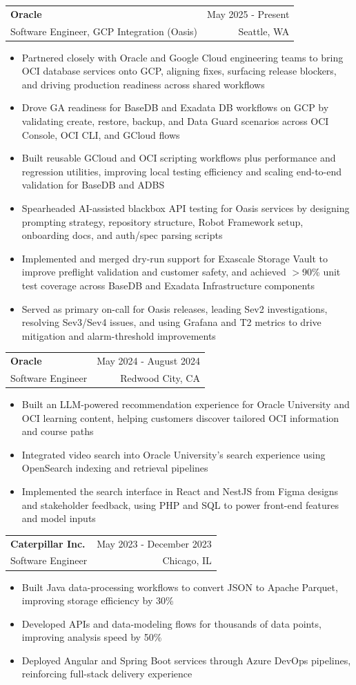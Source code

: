 \documentclass[letterpaper,11pt]{article}
\makeatletter
\newcommand{\resumeItem}[1]{
  \item\small{
    {#1 \vspace{-2pt}}
  }
}
\newcommand{\resumeSubheading}[4]{
  \vspace{-2pt}\item
    \begin{tabular*}{0.97\textwidth}[t]{l@{\extracolsep{\fill}}r}
      \textbf{#1} & #2 \\
      {\small#3} & {\small #4} \\
    \end{tabular*}\vspace{-7pt}
}
\newcommand{\resumeItemListStart}{\begin{itemize}[itemsep=1pt, parsep=0pt, topsep=2pt]}
\newcommand{\resumeItemListEnd}{\end{itemize}\vspace{-5pt}}
\makeatother
\begin{document}
    \resumeSubheading
  {Oracle}{May 2025 - Present}
  {Software Engineer, GCP Integration (Oasis)}{Seattle, WA}
  \resumeItemListStart
    \resumeItem{Partnered closely with Oracle and Google Cloud engineering teams to bring OCI database services onto GCP, aligning fixes, surfacing release blockers, and driving production readiness across shared workflows}
    \resumeItem{Drove GA readiness for BaseDB and Exadata DB workflows on GCP by validating create, restore, backup, and Data Guard scenarios across OCI Console, OCI CLI, and GCloud flows}
    \resumeItem{Built reusable GCloud and OCI scripting workflows plus performance and regression utilities, improving local testing efficiency and scaling end-to-end validation for BaseDB and ADBS}
    \resumeItem{Spearheaded AI-assisted blackbox API testing for Oasis services by designing prompting strategy, repository structure, Robot Framework setup, onboarding docs, and auth/spec parsing scripts}
    \resumeItem{Implemented and merged dry-run support for Exascale Storage Vault to improve preflight validation and customer safety, and achieved $>$90\% unit test coverage across BaseDB and Exadata Infrastructure components}
    \resumeItem{Served as primary on-call for Oasis releases, leading Sev2 investigations, resolving Sev3/Sev4 issues, and using Grafana and T2 metrics to drive mitigation and alarm-threshold improvements}
  \resumeItemListEnd

    \resumeSubheading
      {Oracle}{May 2024 - August 2024}
      {Software Engineer}{Redwood City, CA}
      \resumeItemListStart
        \resumeItem{Built an LLM-powered recommendation experience for Oracle University and OCI learning content, helping customers discover tailored OCI information and course paths}
        \resumeItem{Integrated video search into Oracle University's search experience using OpenSearch indexing and retrieval pipelines}
        \resumeItem{Implemented the search interface in React and NestJS from Figma designs and stakeholder feedback, using PHP and SQL to power front-end features and model inputs}
      \resumeItemListEnd

    \resumeSubheading
      {Caterpillar Inc.}{May 2023 - December 2023}
      {Software Engineer}{Chicago, IL}
      \resumeItemListStart
        \resumeItem{Built Java data-processing workflows to convert JSON to Apache Parquet, improving storage efficiency by 30\%}
        \resumeItem{Developed APIs and data-modeling flows for thousands of data points, improving analysis speed by 50\%}
        \resumeItem{Deployed Angular and Spring Boot services through Azure DevOps pipelines, reinforcing full-stack delivery experience}
      \resumeItemListEnd
\end{document}

